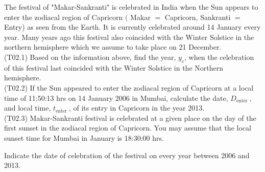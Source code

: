 \documentclass[10pt]{article}
\begin{document}
    The festival of "Makar-Sankranti" is celebrated in India when the Sun appears to enter the zodiacal region of Capricorn $($ Makar $=$ Capricorn, Sankranti $=$ Entry) as seen from the Earth. It is currently celebrated around 14 January every year. Many years ago this festival also coincided with the Winter Solstice in the northern hemisphere which we assume to take place on 21 December.\\
    (T02.1) Based on the information above, find the year, $y_{\mathrm{c}}$, when the celebration of this festival last coincided with the Winter Solstice in the Northern hemisphere.\\
    (T02.2) If the Sun appeared to enter the zodiacal region of Capricorn at a local time of 11:50:13 hrs on 14 January 2006 in Mumbai, calculate the date, $D_{\text {enter }}$, and local time, $t_{\text {enter }}$, of its entry in Capricorn in the year 2013.\\
    (T02.3) Makar-Sankranti festival is celebrated at a given place on the day of the first sunset in the zodiacal region of Capricorn. You may assume that the local sunset time for Mumbai in January is 18:30:00 hrs.

    Indicate the date of celebration of the festival on every year between 2006 and 2013.
\end{document}

